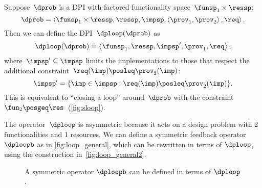 \begin{definition}[$\dploop$]
    \label{def:dp_loop}Suppose~$\dprob$ is a DPI with factored functionality
    space~$\funsp_{1}\times\ressp$:
    \[
        \dprob=\left\langle \funsp_{1}\times\ressp,\ressp,\impsp,\left\langle \prov_{1},\prov_{2}\right\rangle ,\req\right\rangle.
    \]
    Then we can define the DPI~$\dploop(\dprob)$ as
    \[
        \dploop(\dprob)\doteq\left\langle \funsp_{1},\ressp,\impsp',\prov_{1},\req\right\rangle ,
    \]
    where~$\impsp'\subseteq\impsp$ limits the implementations to those
    that respect the additional constraint~$\req(\imp)\posleq\prov_{2}(\imp)$:
    \[
        \impsp'=\{\imp\in\impsp:\req(\imp)\posleq\prov_{2}(\imp)\}.
    \]
    This is equivalent to ``closing a loop'' around~$\dprob$ with
    the constraint~$\fun_{2}\posgeq\res$~(\cref{fig:sloop}).
\end{definition}


The operator~$\dploop$ is asymmetric because it acts on a design
problem with 2 functionalities and 1 resources. We can define a symmetric
feedback operator $\dploopb$ as in \cref{fig:loop_general}, which
can be rewritten in terms of $\dploop$, using the construction in~\cref{fig:loop_general2}\emph{.}

\begin{figure}[h]
    \hspace*{\fill}
    \hspace*{\fill}
    \hspace*{\fill}
    \caption{A symmetric operator $\dploopb$ can be defined in terms of $\dploop$.}
\end{figure}

